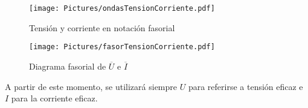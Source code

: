 \documentclass[11pt]{book} %
\numberwithin{dummy}{section}
\theoremstyle{ocrenumbox}
\theoremstyle{blacknumex}
\theoremstyle{blacknumbox}
\theoremstyle{ocrenum}
\newenvironment{remark}{\par\vspace{10pt}\small %
\begin{list}{}{
\leftmargin=35pt %
\rightmargin=25pt}\item\ignorespaces %
\makebox[-2.5pt]{\begin{tikzpicture}[overlay]
\node[draw=ocre!60,line width=1pt,circle,fill=ocre!25,font=\sffamily\bfseries,inner sep=2pt,outer sep=0pt] at (-15pt,0pt){\textcolor{ocre}{N}};\end{tikzpicture}} %
\advance\baselineskip -1pt}{\end{list}\vskip5pt} %
\newlength\esp
\begin{document}
	\begin{figure}[htbp]
		\centering
		\texttt{[image: Pictures/ondasTensionCorriente.pdf]}
		\caption{Tensión y corriente en notación fasorial}
		\label{fig.ondasTensionCorriente}
	\end{figure}
	
	
	\begin{figure}[htbp]
		\centering
		\texttt{[image: Pictures/fasorTensionCorriente.pdf]}
		\caption{Diagrama fasorial de $\overline{U}$ e  $\overline{I}$}
		\label{fig.fasortensioncorriente}
	\end{figure}
	
	\begin{remark}
		A partir de este momento, se utilizará siempre $U$ para referirse a tensión eficaz e $I$ para la corriente eficaz.
	\end{remark}
	
\end{document}
